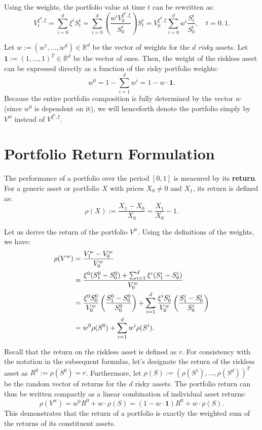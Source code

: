 Using the weights, the portfolio value at time $t$ can be rewritten as:
\begin{equation}
    V_t^{\xi^0, \xi} = \sum_{i=0}^d \xi^i S_t^i = \sum_{i=0}^d \left( \frac{w^i V_0^{\xi^0, \xi}}{S_0^i} \right) S_t^i = V_0^{\xi^0, \xi} \sum_{i=0}^d w^i \frac{S_t^i}{S_0^i}, \quad t = 0, 1.
\end{equation}

Let $w := (w^1, \dots, w^d) \in \mathbb{R}^d$ be the vector of weights for the $d$ \textit{risky} assets. Let $\mathbf{1} := (1, \dots, 1)^T \in \mathbb{R}^d$ be the vector of ones. Then, the weight of the riskless asset can be expressed directly as a function of the risky portfolio weights:
\begin{equation}
    w^0 = 1 - \sum_{i=1}^d w^i = 1 - w \cdot \mathbf{1}.
\end{equation}
Because the entire portfolio composition is fully determined by the vector $w$ (since $w^0$ is dependent on it), we will henceforth denote the portfolio simply by $V^w$ instead of $V^{\xi^0, \xi}$.

\section{Portfolio Return Formulation}

The performance of a portfolio over the period $[0,1]$ is measured by its \textbf{return}. For a generic asset or portfolio $X$ with prices $X_0 \neq 0$ and $X_1$, its return is defined as:
\begin{equation}
    \rho(X) := \frac{X_1 - X_0}{X_0} = \frac{X_1}{X_0} - 1.
\end{equation}

Let us derive the return of the portfolio $V^w$. Using the definitions of the weights, we have:
\begin{align}
    \rho(V^w) &= \frac{V_1^w - V_0^w}{V_0^w} \notag \\
    &= \frac{\xi^0 (S_1^0 - S_0^0) + \sum_{i=1}^d \xi^i (S_1^i - S_0^i)}{V_0^w} \notag \\
    &= \frac{\xi^0 S_0^0}{V_0^w} \left( \frac{S_1^0 - S_0^0}{S_0^0} \right) + \sum_{i=1}^d \frac{\xi^i S_0^i}{V_0^w} \left( \frac{S_1^i - S_0^i}{S_0^i} \right) \notag \\
    &= w^0 \rho(S^0) + \sum_{i=1}^d w^i \rho(S^i).
\end{align}

Recall that the return on the riskless asset is defined as $r$. For consistency with the notation in the subsequent formulas, let's designate the return of the riskless asset as $R^0 := \rho(S^0) = r$.
Furthermore, let $\rho(S) := (\rho(S^1), \dots, \rho(S^d))^T$ be the random vector of returns for the $d$ risky assets. The portfolio return can thus be written compactly as a linear combination of individual asset returns:
\begin{equation}
    \rho(V^w) = w^0 R^0 + w \cdot \rho(S) = (1 - w \cdot \mathbf{1}) R^0 + w \cdot \rho(S).
\end{equation}
This demonstrates that the return of a portfolio is exactly the weighted sum of the returns of its constituent assets.

